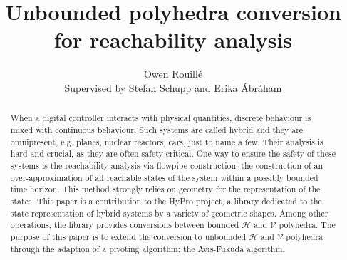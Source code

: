 \documentclass{llncs}
\begin{document}
\title{Unbounded polyhedra conversion for reachability analysis}

\author{Owen Rouill\'e\\ Supervised by Stefan Schupp and Erika \'Abr\'aham}



\maketitle

\begin{abstract}
When a digital controller interacts with physical quantities, discrete behaviour is mixed with continuous behaviour. Such systems are called hybrid and they are omnipresent, e.g. planes, nuclear reactors, cars, just to name a few. Their analysis is hard and crucial, as they are often safety-critical. One way to ensure the safety of these systems is the reachability analysis via flowpipe construction: the construction of an over-approximation of all reachable states of the system within a possibly bounded time horizon. This method strongly relies on geometry for the representation of the states. This paper is a contribution to the HyPro project, a library dedicated to the state representation of hybrid systems by a variety of geometric shapes. Among other operations, the library provides conversions between bounded $\mathcal{H}$ and $\mathcal{V}$ polyhedra. The purpose of this paper is to extend the conversion to unbounded $\mathcal{H}$ and $\mathcal{V}$ polyhedra through the adaption of a pivoting algorithm: the Avis-Fukuda algorithm.
\end{abstract}









\printbibliography
\end{document}
